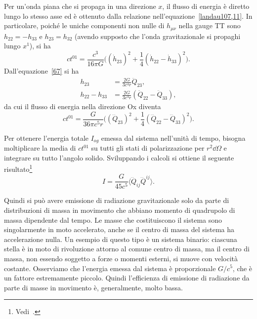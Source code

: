 Per un'onda piana che si propaga in una direzione $x$, il flusso di energia è
diretto lungo lo stesso asse ed è ottenuto dalla relazione
nell'equazione~\eqref{landau107,11}.  In particolare, poiché le uniche
componenti non nulle di $h_{\mu\nu}$ nella gauge TT sono $h_{22} = -h_{33}$ e
$h_{23} = h_{32}$ (avendo supposto che l'onda gravitazionale si propaghi lungo
$x^{1}$), si ha
\begin{equation}
  ct^{01} = \frac{c^{3}}{16\pi G}\bigg((\dot{h}_{23})^{2} +
  \frac{1}{4}(\dot{h}_{22} - \dot{h}_{33})^{2}\bigg).
  \label{70}
\end{equation}
Dall'equazione~\eqref{67} si ha
\begin{subequations}
  \begin{align}
    h_{23} &= \frac{2G}{3c^{4}r} \ddot{Q}_{23}, \\
    h_{22} - h_{33} &= \frac{2G}{3c^{4}r}(\ddot{Q}_{22} - \ddot{Q}_{33}),
   \end{align}
\end{subequations}
da cui il flusso di energia nella direzione Ox diventa
\begin{equation}
  ct^{01} = \frac{G}{36\pi c^{5}r}\bigg((\dddot{Q}_{23})^{2} +
  \frac{1}{4}(\dddot{Q}_{22} - \dddot{Q}_{33})^{2}\bigg).
\end{equation}

Per ottenere l'energia totale $I_{og}$ emessa dal sistema nell'unità di tempo,
bisogna moltiplicare la media di $ct^{01}$ su tutti gli stati di polarizzazione
per $r^{2}\dd\Omega$ e integrare su tutto l'angolo solido.  Sviluppando i
calcoli si ottiene il seguente
risultato\footnote{Vedi~\textcite[460-461]{landau:campi}.}
\begin{equation}
  I = \frac{G}{45c^{5}} \langle \dddot{Q}_{ij} \dddot{Q}^{ij}\rangle.
\end{equation}

Quindi si può avere emissione di radiazione gravitazionale solo da parte di
distribuzioni di massa in movimento che abbiano momento di quadrupolo di massa
dipendente dal tempo.  Le masse che costituiscono il sistema sono singolarmente
in moto accelerato, anche se il centro di massa del sistema ha accelerazione
nulla.  Un esempio di questo tipo è un sistema binario: ciascuna stella è in
moto di rivoluzione attorno al comune centro di massa, ma il centro di massa,
non essendo soggetto a forze o momenti esterni, si muove con velocità costante.
Osserviamo che l'energia emessa dal sistema è proporzionale $G/c^{5}$, che è un
fattore estremamente piccolo. Quindi l'efficienza di emissione di radiazione da
parte di masse in movimento è, generalmente, molto bassa.


